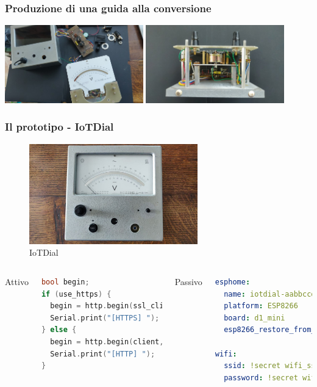 \documentclass[aspectratio=169]{beamer}
\begin{document}
\begin{frame}
\frametitle{Produzione di una guida alla conversione}
\centering
\includegraphics[width=0.45\textwidth]{strumentosmontato}
\enspace
\includegraphics[width=0.45\textwidth]{strumentosenzascocca}
\end{frame}


\begin{frame}
\frametitle{Il prototipo - IoTDial}
\begin{figure}[h]
  \centering
  \includegraphics[width=0.65\textwidth]{iotdial}
  \caption{IoTDial}
\end{figure}

\framebreak

\begin{columns}
Attivo
\begin{lstlisting}[language=cpp]
bool begin;
if (use_https) {
  begin = http.begin(ssl_client, apiUrl);
  Serial.print("[HTTPS] ");
} else {
  begin = http.begin(client, apiUrl);
  Serial.print("[HTTP] ");
}
\end{lstlisting}

Passivo
\begin{lstlisting}[language=yaml]
esphome:
  name: iotdial-aabbccdd
  platform: ESP8266
  board: d1_mini
  esp8266_restore_from_flash: yes

wifi:
  ssid: !secret wifi_ssid
  password: !secret wifi_password
\end{lstlisting}
\end{columns}
\end{frame}
\end{document}
